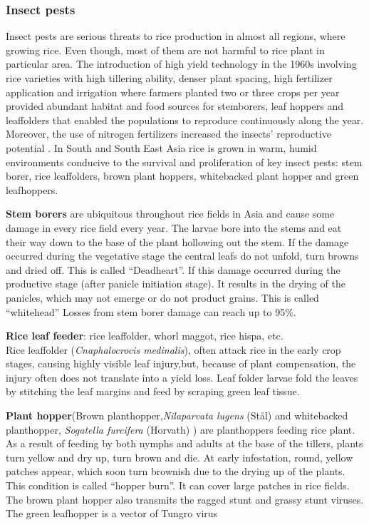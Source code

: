\subsubsection*{Insect pests}
Insect pests are serious threats to rice production in almost all regions, where growing rice. Even though, most of them are not harmful to rice plant in particular area. The introduction of high yield technology in the 1960s involving rice varieties with high tillering ability, denser plant spacing, high fertilizer application and irrigation where farmers planted two or three crops per year provided abundant habitat and food sources for stemborers, leaf hoppers and leaffolders that enabled the populations to reproduce continuously along the year. Moreover, the use of nitrogen fertilizers increased the insects’ reproductive potential \citet{bottrell2012resurrecting}. In South and South East Asia rice is grown in warm, humid environments conducive to the survival and proliferation of key insect pests: stem borer, rice leaffolders, brown plant hoppers, whitebacked plant hopper and green leafhoppers.

\textbf{Stem borers} are ubiquitous throughout rice fields in Asia and cause some damage in every rice field every year. The larvae bore into the stems and eat their way down to the base of the plant hollowing out the stem. If the damage occurred during the vegetative stage the central leafs do not unfold, turn browns and dried off. This is called ``Deadheart''. If this damage occurred during the productive stage (after panicle initiation stage). It results in the drying of the panicles, which may not emerge or do not product grains. This is called ``whitehead'' Losses from stem borer damage can reach up to 95\%. 

\textbf{Rice leaf feeder}: rice leaffolder, whorl maggot, rice hispa, etc. \\ 
Rice leaffolder (\textit{Cnaphalocrocis medinalis}), often attack rice in the early crop stages, causing highly visible leaf injury,but, because of plant compensation, the injury often does not translate into a yield loss. Leaf folder larvae fold the leaves by stitching the leaf margins and feed by scraping green leaf tissue.

\textbf{Plant hopper}(Brown planthopper,\textit{Nilaparvata lugens} (St\aa l) and whitebacked planthopper, \textit{Sogatella furcifera} (Horvath) ) are planthoppers feeding rice plant.  As a result of feeding by both nymphs and adults at the base of the tillers, plants turn yellow and dry up, turn brown and die. At early infestation, round, yellow patches appear, which soon turn brownish due to the drying up of the plants. This condition is called ``hopper burn''. It can cover large patches in rice fields. The brown plant hopper also transmits the ragged stunt and grassy stunt viruses. The green leafhopper is a vector of Tungro virus

